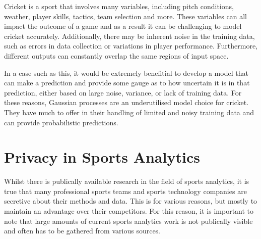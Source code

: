 \documentclass[12pt,a4paper]{report}
\theoremstyle{definition}
\begin{document}
Cricket is a sport that involves many variables, including pitch conditions, weather, player skills, tactics, team selection and more.
These variables can all impact the outcome of a game and as a result it can be challenging to model cricket accurately. 
Additionally, there may be inherent noise in the training data, such as errors in data collection or variations in player performance.
Furthermore, different outputs can constantly overlap the same regions of input space.

In a case such as this, it would be extremely benefitial to develop a model that can make a prediction and provide some gauge as to how uncertain it is in that prediction, either based on large noise, variance, or lack of training data.
For these reasons, Gaussian processes are an underutilised model choice for cricket. 
They have much to offer in their handling of limited and noisy training data and can provide probabilistic predictions.

\section{Privacy in Sports Analytics}

Whilst there is publically available research in the field of sports analytics, it is true that many professional sports teams and sports technology companies are secretive about their methods and data. 
This is for various reasons, but mostly to maintain an advantage over their competitors.
For this reason, it is important to note that large amounts of current sports analytics work is not publically visible and often has to be gathered from various sources.
\end{document}
